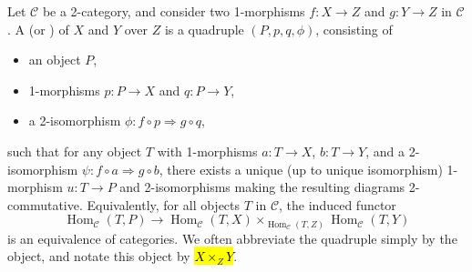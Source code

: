 \begin{definition} \label{definition:2_fiber_product_of_1_morphisms_in_a_2_category}
Let $\mathcal{C}$ be a 2-category, and consider two 1-morphisms $f \colon X \to Z$ and $g \colon Y \to Z$ in $\mathcal{C}$. A  (or ) of $X$ and $Y$ over $Z$ is a quadruple $(P, p, q, \phi)$, consisting of
\begin{itemize}
    \item an object $P$,
    \item 1-morphisms $p \colon P \to X$ and $q \colon P \to Y$,
    \item a 2-isomorphism $\phi \colon f \circ p \Rightarrow g \circ q$,
\end{itemize}
such that for any object $T$ with 1-morphisms $a \colon T \to X$, $b \colon T \to Y$, and a 2-isomorphism $\psi \colon f \circ a \Rightarrow g \circ b$, there exists a unique (up to unique isomorphism) 1-morphism $u \colon T \to P$ and 2-isomorphisms making the resulting diagrams 2-commutative. Equivalently, for all objects $T$ in $\mathcal{C}$, the induced functor
$$\operatorname{Hom}_{\mathcal{C}}(T, P) \to \operatorname{Hom}_{\mathcal{C}}(T, X) \times_{\operatorname{Hom}_{\mathcal{C}}(T, Z)} \operatorname{Hom}_{\mathcal{C}}(T, Y)$$
is an equivalence of categories. We often abbreviate the quadruple simply by the object, and notate this object by \hl{$X \times_Z Y$}.
\end{definition}